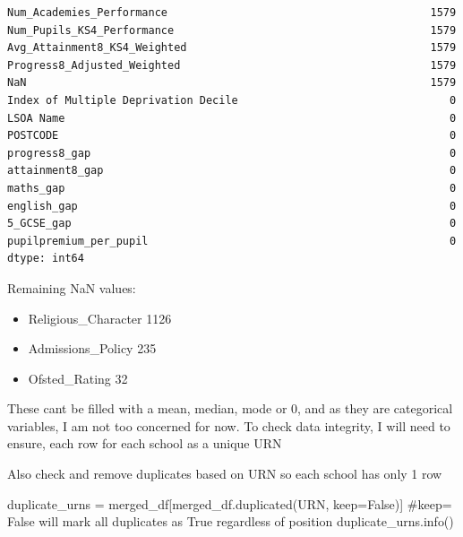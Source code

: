 \documentclass[
  letterpaper,
  DIV=11,
  numbers=noendperiod]{scrartcl}
\newenvironment{Shaded}{\begin{snugshade}}{\end{snugshade}}
\newcommand{\CommentTok}[1]{\textcolor[rgb]{0.37,0.37,0.37}{#1}}
\newcommand{\NormalTok}[1]{\textcolor[rgb]{0.00,0.23,0.31}{#1}}
\newcommand{\OperatorTok}[1]{\textcolor[rgb]{0.37,0.37,0.37}{#1}}
\newcommand{\StringTok}[1]{\textcolor[rgb]{0.13,0.47,0.30}{#1}}
\newcommand{\VariableTok}[1]{\textcolor[rgb]{0.07,0.07,0.07}{#1}}
\providecommand{\tightlist}{%
  \setlength{\itemsep}{0pt}\setlength{\parskip}{0pt}}\usepackage{longtable,booktabs,array}
\begin{document}
\begin{verbatim}
Num_Academies_Performance                                         1579
Num_Pupils_KS4_Performance                                        1579
Avg_Attainment8_KS4_Weighted                                      1579
Progress8_Adjusted_Weighted                                       1579
NaN                                                               1579
Index of Multiple Deprivation Decile                                 0
LSOA Name                                                            0
POSTCODE                                                             0
progress8_gap                                                        0
attainment8_gap                                                      0
maths_gap                                                            0
english_gap                                                          0
5_GCSE_gap                                                           0
pupilpremium_per_pupil                                               0
dtype: int64
\end{verbatim}

Remaining NaN values:

\begin{itemize}
\tightlist
\item
  Religious\_Character 1126
\item
  Admissions\_Policy 235
\item
  Ofsted\_Rating 32
\end{itemize}

These cant be filled with a mean, median, mode or 0, and as they are
categorical variables, I am not too concerned for now. To check data
integrity, I will need to ensure, each row for each school as a unique
URN

Also check and remove duplicates based on URN so each school has only 1
row

\begin{Shaded}
\begin{Highlighting}[]
\NormalTok{duplicate\_urns }\OperatorTok{=}\NormalTok{ merged\_df[merged\_df.duplicated(}\StringTok{\textquotesingle{}URN\textquotesingle{}}\NormalTok{, keep}\OperatorTok{=}\VariableTok{False}\NormalTok{)] }
\CommentTok{\#keep= False will mark all duplicates as True regardless of position}
\NormalTok{duplicate\_urns.info()}
\end{Highlighting}
\end{Shaded}
\end{document}
